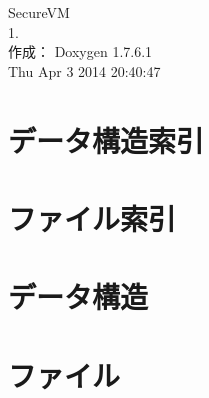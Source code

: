 \documentclass[a4paper]{book}
\begin{document}
\begin{titlepage}
\vspace*{7cm}
\begin{center}
{\Large \-Secure\-V\-M \\[1ex]\large 1. }\\
\vspace*{1cm}
{\large 作成： Doxygen 1.7.6.1}\\
\vspace*{0.5cm}
{\small Thu Apr 3 2014 20:40:47}\\
\end{center}
\end{titlepage}
\clearemptydoublepage
{}
\tableofcontents
\clearemptydoublepage
{}
\chapter{データ構造索引}

\chapter{ファイル索引}

\chapter{データ構造}








\chapter{ファイル}





\printindex
\end{document}
